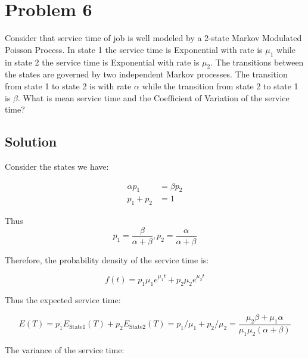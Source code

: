 \section*{Problem 6}

Consider that service time of job is well modeled by a 2-state Markov Modulated Poisson Process.
In state 1 the service time is Exponential with rate is $\mu_1$ while in state 2 the service time is Exponential with rate is $\mu_2$.
The transitions between the states are governed by two independent Markov processes.
The transition from state 1 to state 2 is with rate $\alpha$ while the transition from state 2 to state 1 is $\beta$.
What is mean service time and the Coefficient of Variation of the service time?

\subsection*{Solution}

Consider the states we have:

\begin{align*}
    \alpha p_1 & = \beta p_2 \\
    p_1  + p_2 & = 1
\end{align*}

Thus $$p_1 = \frac{\beta}{\alpha + \beta}, p_2 = \frac{\alpha}{\alpha + \beta}$$

Therefore, the probability density of the service time is:

$$ f(t) = p_1\mu_1 e^{\mu_1t} + p_2\mu_2 e^{\mu_2t} $$

Thus the expected service time:

$$E(T) = p_1E_{\text{State1}}(T)+p_2E_{\text{State2}}(T) = p_1/\mu_1 + p_2/\mu_2 = \frac{\mu_2\beta + \mu_1\alpha}{\mu_1\mu_2(\alpha+\beta)} $$

The variance of the service time:

